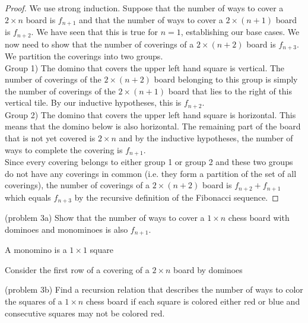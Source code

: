\documentclass[handout]{ximera}
\begin{document}
\begin{proof}
We use strong induction. Suppose that the number of ways to cover a $2 \times n$ board is $f_{n+1}$ and that the number of ways to cover a 
$2 \times (n+1)$ board is $f_{n+2}$. We have seen that this is true for $n = 1$, establishing our base cases.
We now need to show that the number of coverings of a $2 \times (n+2)$ board is $f_{n+3}$. We partition the coverings into two groups.\\
Group 1) The domino that covers the upper left hand square is vertical.  The number of coverings of 
the $2 \times (n+2)$ board belonging to this group is simply the number of coverings of the $2 \times (n+1)$ board that 
lies to the right of this vertical tile.  By our inductive hypotheses, this is $f_{n+2}$.\\
Group 2) The domino that covers the upper left hand square is horizontal. This means that the domino below is also horizontal. 
The remaining part of the board that is not yet covered is $2 \times n$ and by the inductive hypotheses, 
the number of ways to complete the covering is $f_{n+1}$.\\
Since every covering belongs to either group 1 or group 2 and these two groups do not have any coverings in 
common (i.e. they form a partition of the set of all coverings), the number of coverings of a $2 \times (n+2)$ board 
is $f_{n+2} + f_{n+1}$ which equals $f_{n+3}$ by the recursive definition of the Fibonacci sequence.

\end{proof}

\begin{problem}(problem 3a) 
Show that the number of ways to cover a $1 \times n$ chess board with dominoes and monominoes is also $f_{n+1}$.
\begin{hint}
A monomino is a $1 \times 1$ square
\end{hint}
\begin{hint}
Consider the first row of a covering of a $2 \times n$ board by dominoes
\end{hint}
\end{problem}

\begin{problem}(problem 3b) 
Find a recursion relation that describes the number of ways to color the squares of a $1 \times n$ chess board if each square is colored either red or blue and consecutive squares may not be colored red.\\

\begin{multipleChoice}
\\
\\
\\
\end{multipleChoice}

\end{problem}
\end{document}
